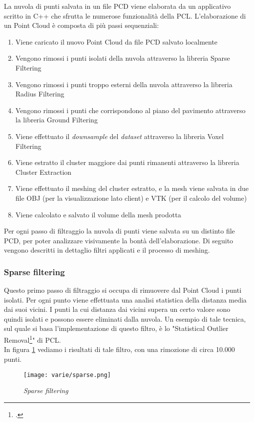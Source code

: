 La nuvola di punti salvata in un file PCD viene elaborata da un applicativo scritto in C++ che sfrutta le numerose funzionalità della PCL.
L'elaborazione di un Point Cloud è composta di più passi sequenziali:
\begin{enumerate}
\item Viene caricato il nuovo Point Cloud da file PCD salvato localmente
\item Vengono rimossi i punti isolati della nuvola attraverso la libreria Sparse Filtering
\item Vengono rimossi i punti troppo esterni della nuvola attraverso la libreria Radius Filtering 
\item Vengono rimossi i punti che corrispondono al piano del pavimento attraverso la libreria Ground Filtering
\item Viene effettuato il \emph{downsample} del \emph{dataset} attraverso la libreria Voxel Filtering
\item Viene estratto il cluster maggiore dai punti rimanenti attraverso la libreria Cluster Extraction
\item Viene effettuato il meshing del cluster estratto, e la mesh viene salvata in due file OBJ (per la visualizzazione lato client) e VTK (per il calcolo del volume)
\item Viene calcolato e salvato il volume della mesh prodotta
\end{enumerate}
Per ogni passo di filtraggio la nuvola di punti viene salvata su un distinto file PCD, per poter analizzare visivamente la bontà dell'elaborazione.
Di seguito vengono descritti in dettaglio filtri applicati e il processo di meshing.

\subsubsection{Sparse filtering}
Questo primo passo di filtraggio si occupa di rimuovere dal Point Cloud i punti isolati. Per ogni punto viene effettuata una analisi statistica della distanza media dai suoi vicini. I punti la cui distanza dai vicini supera un certo valore sono quindi isolati e possono essere eliminati dalla nuvola.
Un esempio di tale tecnica, sul quale si basa l'implementazione di questo filtro, è lo "Statistical Outlier Removal\footcite{http://pointclouds.org/documentation/tutorials/statistical_outlier.php/statistical-outlier-removal}" di PCL.\\
In figura \ref{fig:sparse} vediamo i risultati di tale filtro, con una rimozione di circa 10.000 punti.
\begin{figure}[!h] 
    \centering 
    \texttt{[image: varie/sparse.png]} 
    \caption{\emph{Sparse filtering}}
    \label{fig:sparse}
\end{figure}
